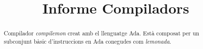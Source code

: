 

\title{Informe Compiladors}


\maketitle

\begin{abstract}
Compilador \emph{compilemon} creat amb el llenguatge Ada. Està
composat per un subconjunt bàsic d'instruccions en Ada conegudes
com \emph{lemonada}.
\end{abstract}

\thispagestyle{empty}


\newpage

\newpage

\newpage

\newpage

\newpage

\tableofcontents


